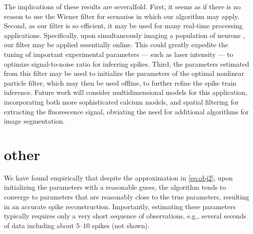 \documentclass[12pt]{article}
\begin{document}
The implications of these results are severalfold.  First, it seems as if there is no reason to use the Wiener filter for scenarios in which our algorithm may apply.  Second, as our filter is so efficient, it may be used for many real-time processing applications.  Specifically, upon simultaneously imaging a population of neurons \cite{IkegayaYuste04, NiellSmith05, OhkiReid05, YaksiFriedrich06, SatoSvoboda07}, our filter may be applied essentially online.  This could greatly expedite the tuning of important experimental parameters --- such as laser intensity --- to optimize signal-to-noise ratio for inferring spikes.  Third, the parameters estimated from this filter may be used to initialize the parameters of the optimal nonlinear particle filter, which may then be used offline, to further refine the spike train inference. %
Future work will consider multidimensional models for this application, incorporating both more sophisticated calcium models, and spatial filtering for extracting the fluorescence signal, obviating the need for additional algorithms for image segmentation. 

\section{other}

We have found empirically that despite the approximation in \eqref{eq:obj2}, upon initializing the parameters with a reasonable guess, the algorithm tends to converge to parameters that are reasonably close to the true parameters, resulting in an accurate spike reconstruction. Importantly, estimating these parameters typically requires only a very short sequence of observations, e.g., several seconds of data including about $5$--$10$ spikes (not shown).
\end{document}
